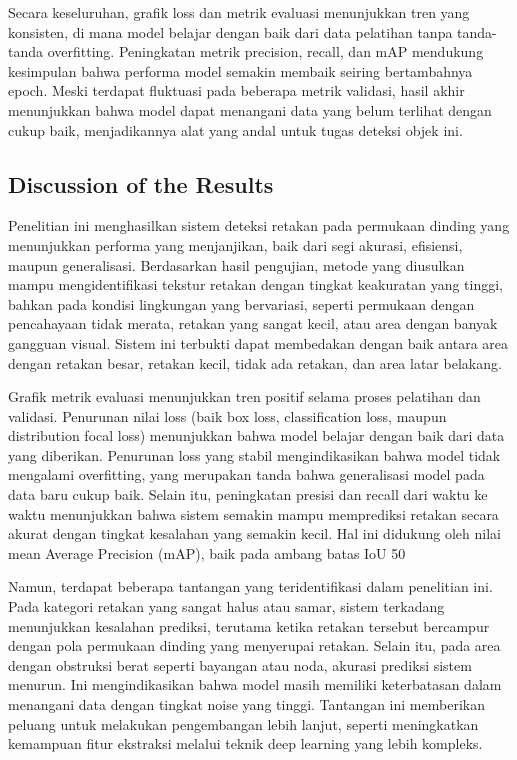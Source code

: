 \documentclass[12pt,a4paper]{article}
\begin{document}
\begin{adjustwidth}{3em}{0pt}
Secara keseluruhan, grafik loss dan metrik evaluasi menunjukkan tren yang konsisten, di mana model belajar dengan baik dari data pelatihan tanpa tanda-tanda overfitting. Peningkatan metrik precision, recall, dan mAP mendukung kesimpulan bahwa performa model semakin membaik seiring bertambahnya epoch. Meski terdapat fluktuasi pada beberapa metrik validasi, hasil akhir menunjukkan bahwa model dapat menangani data yang belum terlihat dengan cukup baik, menjadikannya alat yang andal untuk tugas deteksi objek ini.

\end{adjustwidth}

\subsection{Discussion of the Results}
\begin{adjustwidth}{3em}{0pt}
\hspace{0.5cm} Penelitian ini menghasilkan sistem deteksi retakan pada permukaan dinding yang menunjukkan performa yang menjanjikan, baik dari segi akurasi, efisiensi, maupun generalisasi. Berdasarkan hasil pengujian, metode yang diusulkan mampu mengidentifikasi tekstur retakan dengan tingkat keakuratan yang tinggi, bahkan pada kondisi lingkungan yang bervariasi, seperti permukaan dengan pencahayaan tidak merata, retakan yang sangat kecil, atau area dengan banyak gangguan visual. Sistem ini terbukti dapat membedakan dengan baik antara area dengan retakan besar, retakan kecil, tidak ada retakan, dan area latar belakang.

Grafik metrik evaluasi menunjukkan tren positif selama proses pelatihan dan validasi. Penurunan nilai loss (baik box loss, classification loss, maupun distribution focal loss) menunjukkan bahwa model belajar dengan baik dari data yang diberikan. Penurunan loss yang stabil mengindikasikan bahwa model tidak mengalami overfitting, yang merupakan tanda bahwa generalisasi model pada data baru cukup baik. Selain itu, peningkatan presisi dan recall dari waktu ke waktu menunjukkan bahwa sistem semakin mampu memprediksi retakan secara akurat dengan tingkat kesalahan yang semakin kecil. Hal ini didukung oleh nilai mean Average Precision (mAP), baik pada ambang batas IoU 50%

Namun, terdapat beberapa tantangan yang teridentifikasi dalam penelitian ini. Pada kategori retakan yang sangat halus atau samar, sistem terkadang menunjukkan kesalahan prediksi, terutama ketika retakan tersebut bercampur dengan pola permukaan dinding yang menyerupai retakan. Selain itu, pada area dengan obstruksi berat seperti bayangan atau noda, akurasi prediksi sistem menurun. Ini mengindikasikan bahwa model masih memiliki keterbatasan dalam menangani data dengan tingkat noise yang tinggi. Tantangan ini memberikan peluang untuk melakukan pengembangan lebih lanjut, seperti meningkatkan kemampuan fitur ekstraksi melalui teknik deep learning yang lebih kompleks.


\end{adjustwidth}
\end{document}
